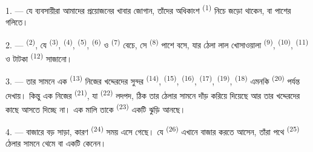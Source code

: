 %

\VUsaut{4.0mm}
\VUsaut{3.0mm}

\VUsaut{3.0mm}

1. --- যে ব্যবসায়ীরা আমাদের প্রয়োজনের খাবার জোগান, তাঁদের অধিকাংশ
  \textsuperscript{(1)} নিচে জড়ো থাকেন, বা
পাশের গলিতে।

2. ---  \textsuperscript{(2)}, যে 
\textsuperscript{(3)},  \textsuperscript{(4)},
 \textsuperscript{(5)},  \textsuperscript{(6)}
ও  \textsuperscript{(7)} বেচে, সে  \textsuperscript{(8)} পাশে বসে, যার ঠেলা লাল খোসাওয়ালা
 \textsuperscript{(9)}, 
\textsuperscript{(10)},  \textsuperscript{(11)} ও
টাটকা  \textsuperscript{(12)} সাজানো।

3. --- তার সামনে এক  \textsuperscript{(13)} নিজের
খদ্দেরদের সুন্দর  \textsuperscript{(14)}, 
\textsuperscript{(15)},  \textsuperscript{(16)}, 
\textsuperscript{(17)},  \textsuperscript{(19)}, 
\textsuperscript{(18)} এমনকি  \textsuperscript{(20)} পর্যন্ত
দেখায়। কিন্তু এক  নিজের 
\textsuperscript{(21)}, যা  \textsuperscript{(22)} লদপদ,
ঠিক তার ঠেলার সামনে দাঁড় করিয়ে দিয়েছে আর তার খদ্দেরদের কাছে আসতে দিচ্ছে না।
এক মালি তাকে  \textsuperscript{(23)} একটি ঝুড়ি আনছে।

\VUsaut{4.0mm}
\VUsaut{3.0mm}

4. --- বাজারে বড় সাড়া, কারণ  \textsuperscript{(24)} সময় এসে
গেছে। যে  \textsuperscript{(26)} এখানে বাজার করতে আসেন, তাঁরা
পথে  \textsuperscript{(25)} ঠেলার সামনে থেমে
 বা একটি  কেনেন।

